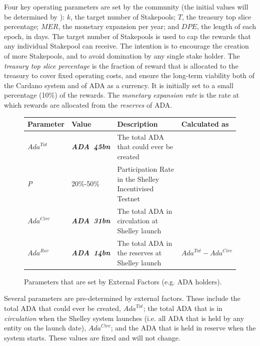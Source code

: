 \documentclass[11pt,a4paper,dvipsnames,twosided,final]{article}
\newcommand{\ada}{ADA{}}
\newcommand{\ADA}[1]{\textbf{\emph{\ada~{#1}}}}
\newcommand{\cardano}[1]{Cardano}
\begin{document}
\noindent
Four key operating parameters are set by the community (the initial values will be determined by \IOHK):
$k$, the target number of Stakepools;
$T$, the treasury top slice percentage;
$\textit{MER}$, the monetary expansion per year;
and
$\textit{DPE}$, the length of each epoch, in days.
%
The target number of Stakepools is used to cap the rewards that any individual Stakepool can receive. The intention is to encourage the creation of more Stakepools, and to avoid domination by any single stake holder.
The \emph{treasury top slice percentage} is the fraction of reward that is allocated to the treasury to cover fixed operating costs, and
ensure the long-term viability both of the \cardano{} system and of \ada{} as a currency.  It is initially set to a small percentage (10\%) of the rewards.
The \emph{monetary expansion rate} is the rate at which rewards are allocated from the \emph{reserves} of \ada{}.

\begin{figure}[h!]
\begin{center}
\begin{tabular}{||l|l|p{6cm}|l||}
  \hline \hline
\textbf{Parameter} & \textbf{Value} & \textbf{Description} & \textbf{Calculated as} \\\hline
$\textit{Ada}^{Tot}$ & \ADA{45bn} & The total \ada{} that could ever be created & \\\hline
\emph{P} & 20\%-50\% & Participation Rate in the Shelley Incentivised Testnet & \\\hline
$\textit{Ada}^{\textit{Circ}}$ & \ADA{31bn} & The total \ada{} in circulation at Shelley launch & \\\hline
$\textit{Ada}^{\textit{Rsv}}$ & \ADA{14bn} & The total \ada{} in the reserves at Shelley launch & $\textit{Ada}^{Tot} - \textit{Ada}^{\textit{Circ}}$ \\\hline
\hline
\end{tabular}
\end{center}
\caption{Parameters that are set by External Factors (e.g. \ada{} holders).}
\end{figure}

\noindent
Several parameters are pre-determined by external factors. These include the
total \ada{} that could ever be created, $\textit{Ada}^{Tot}$;
the total \ada{} that is in \emph{circulation} when the Shelley system launches
(i.e. all \ada{} that is held by any entity on the launch date), $\textit{Ada}^{\textit{Circ}}$;
and the \ada{} that is held in reserve when the system starts.
These values are fixed and will not change.
\end{document}

